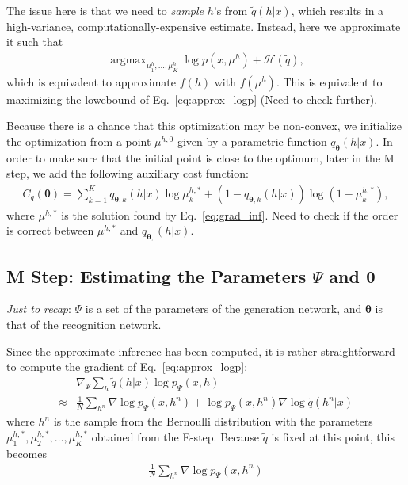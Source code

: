 \documentclass{article}
\newcommand{\vects}[1]{\boldsymbol{#1}}
\newcommand{\TT}[0]{\vects{\theta}}
\newcommand{\HH}[0]{\mathcal{H}}
\DeclareMathOperator*{\argmax}{\arg \max}
\begin{document}
The issue here is that we need to {\em sample} $h$'s from $\tilde{q}(h|x)$,
which results in a high-variance, computationally-expensive estimate. Instead,
here we approximate it such that
\begin{align}
    \label{eq:grad_inf}
    \argmax_{\mu^h_1, \ldots, \mu^h_K} 
    \log p(x,\mu^h) + \HH(\tilde{q}),
\end{align}
which is equivalent to approximate $f(h)$ with $f(\mu^h)$. {\color{red} This is equivalent to
maximizing the lowebound of Eq.~\eqref{eq:approx_logp} (Need to check further)}.

Because there is a chance that this optimization may be non-convex, we
initialize the optimization from a point $\mu^{h,0}$ given by a parametric
function $q_{\TT}(h|x)$. In order to make sure that the initial point is close
to the optimum, later in the M step, we add the following auxiliary cost
function:
\begin{align}
    \label{eq:c_q}
    C_q(\TT) = \sum_{k=1}^K q_{\TT,k}(h|x) \log \mu^{h,*}_k + 
    (1 - q_{\TT,k}(h|x)) \log (1 - \mu^{h,*}_k),
\end{align}
where $\mu^{h,*}$ is the solution found by Eq.~\eqref{eq:grad_inf}. {\color{red}
    Need to check if the order is correct between $\mu^{h,*}$ and
$q_{\TT,}(h|x)$.}

\subsection{M Step: Estimating the Parameters $\Psi$ and $\TT$}

{\em Just to recap}: $\Psi$ is a set of the parameters of the generation
network, and $\TT$ is that of the recognition network.

Since the approximate inference has been computed, it is rather straightforward
to compute the gradient of Eq.~\eqref{eq:approx_logp}:
\begin{align*}
    &\nabla_{\Psi} \sum_h \tilde{q}(h|x) \log p_{\Psi}(x,h) \\
    \approx&
    \frac{1}{N} \sum_{h^n} \nabla \log p_{\Psi}(x,h^n) 
    + \log p_{\Psi}(x,h^n) \nabla \log \tilde{q}(h^n|x) 
\end{align*}
where $h^n$ is the sample from the Bernoulli distribution with the parameters
$\mu^{h,*}_1, \mu^{h,*}_2, \ldots, \mu^{h,*}_K$ obtained from the E-step.
Because $\tilde{q}$ is fixed at this point, this becomes
\begin{align}
    \label{eq:m_step}
    \frac{1}{N} \sum_{h^n} \nabla \log p_{\Psi}(x,h^n) 
\end{align}
\end{document}
